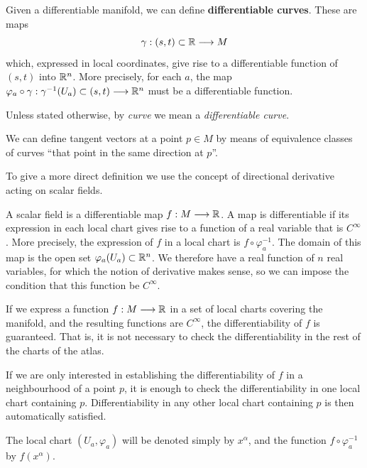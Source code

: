 \begin{points}
\item Given a differentiable manifold, we can define \textbf{differentiable curves}. These are maps
\[
  \gamma:(s,t)\subset\mathbb{R}\longrightarrow M
\]
which, expressed in local coordinates, give rise to a differentiable function of $(s,t)$ into $\mathbb{R}^n$. More precisely, for each $a$, the map $\varphi_a\circ\gamma:\gamma^{-1}(U_a)\subset(s,t)\longrightarrow\mathbb{R}^n$ must be a differentiable function.

\item Unless stated otherwise, by \emph{curve} we mean a \emph{differentiable curve}.

\item We can define tangent vectors at a point $p\in M$ by means of equivalence classes of curves ``that point in the same direction at $p$''.

\item To give a more direct definition we use the concept of directional derivative acting on scalar fields.

\item A scalar field is a differentiable map $f:M\longrightarrow\mathbb{R}$. A map is differentiable if its expression in each local chart gives rise to a function of a real variable that is $C^\infty$. More precisely, the expression of $f$ in a local chart is $f\circ\varphi_a^{-1}$. The domain of this map is the open set $\varphi_a(U_a)\subset\mathbb{R}^n$. We therefore have a real function of $n$ real variables, for which the notion of derivative makes sense, so we can impose the condition that this function be $C^\infty$.

\item If we express a function $f:M\longrightarrow\mathbb{R}$ in a set of local charts covering the manifold, and the resulting functions are $C^\infty$, the differentiability of $f$ is guaranteed. That is, it is not necessary to check the differentiability in the rest of the charts of the atlas.

\item If we are only interested in establishing the differentiability of $f$ in a neighbourhood of a point $p$, it is enough to check the differentiability in one local chart containing $p$. Differentiability in any other local chart containing $p$ is then automatically satisfied.

\item The local chart $(U_a,\varphi_a)$ will be denoted simply by $x^\alpha$, and the function $f\circ\varphi_a^{-1}$ by $f(x^\alpha)$.


\end{points}

